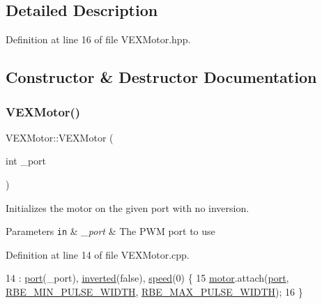 \subsection{Detailed Description}


Definition at line 16 of file V\+E\+X\+Motor.\+hpp.



\subsection{Constructor \& Destructor Documentation}
\mbox{\label{class_v_e_x_motor_a580907c6cae0d4f8c525c5ce5916c9f8}} 
\subsubsection{\texorpdfstring{V\+E\+X\+Motor()}{VEXMotor()}\hspace{0.1cm}{\footnotesize\ttfamily [1/2]}}
{\footnotesize\ttfamily V\+E\+X\+Motor\+::\+V\+E\+X\+Motor (\begin{DoxyParamCaption}\item[{int}]{\+\_\+port }\end{DoxyParamCaption})}



Initializes the motor on the given port with no inversion. 


\begin{DoxyParams}[1]{Parameters}
\mbox{\tt in}  & {\em \+\_\+port} & The P\+WM port to use \\
\hline
\end{DoxyParams}


Definition at line 14 of file V\+E\+X\+Motor.\+cpp.


\begin{DoxyCode}
14                             : \hyperlink{class_v_e_x_motor_a4d116557bd4fd7149a498980369bace5}{port}(\_port), \hyperlink{class_v_e_x_motor_ae0059b010c3c3185c43918cec2c021e8}{inverted}(\textcolor{keyword}{false}), \hyperlink{class_v_e_x_motor_a6ab8752bef90d706c107826a436afa24}{speed}(0)  \{
15     \hyperlink{class_v_e_x_motor_a6cc23059af5cd57eafe31c900698d1a1}{motor}.attach(\hyperlink{class_v_e_x_motor_a4d116557bd4fd7149a498980369bace5}{port}, \hyperlink{_v_e_x_motor_8hpp_aa9feeec64ccb5213d77b52847c8d0107}{RBE\_MIN\_PULSE\_WIDTH}, 
      \hyperlink{_v_e_x_motor_8hpp_a87b3200bbaecc17e872da87d4ff827b8}{RBE\_MAX\_PULSE\_WIDTH});
16 \}
\end{DoxyCode}
\mbox{\label{class_v_e_x_motor_a7de15da93ffb3034b3dc34d106b68ac6}} 
